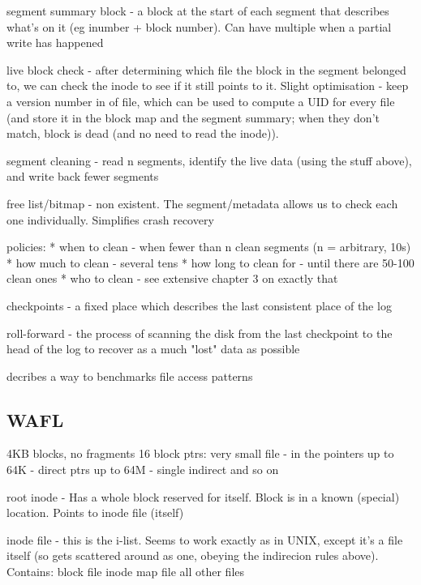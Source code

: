 \documentclass[a4paper]{article}
\begin{document}
        segment summary block - a block at the start of each segment that
        describes what's on it (eg inumber + block number). Can have multiple
        when a partial write has happened

        live block check - after determining which file the block in the
        segment belonged to, we can check the inode to see if it still points
        to it. Slight optimisation - keep a version number in of file, which
        can be used to compute a UID for every file (and store it in the block
        map and the segment summary; when they don't match, block is dead (and
        no need to read the inode)).

        segment cleaning - read n segments, identify the live data (using the
        stuff above), and write back fewer segments

        free list/bitmap - non existent. The segment/metadata allows us to
        check each one individually. Simplifies crash recovery

        policies:
        * when to clean - when fewer than n clean segments (n = arbitrary, 10s)
        * how much to clean - several tens
        * how long to clean for - until there are 50-100 clean ones
        * who to clean - see extensive chapter 3 on exactly that

        checkpoints - a fixed place which describes the last consistent place
        of the log

        roll-forward - the process of scanning the disk from the last
        checkpoint to the head of the log to recover as a much "lost" data as
        possible



        decribes a way to benchmarks file access patterns




    \subsection{WAFL}
        4KB blocks, no fragments
        16 block ptrs:
            very small file - in the pointers
            up to 64K - direct ptrs
            up to 64M - single indirect and so on

        root inode - Has a whole block reserved for itself. Block is in a known
        (special) location. Points to inode file (itself)

        inode file - this is the i-list. Seems to work exactly as in UNIX,
        except it's a file itself (so gets scattered around as one, obeying the
        indirecion rules above). Contains:
            block file
            inode map file
            all other files
\end{document}

